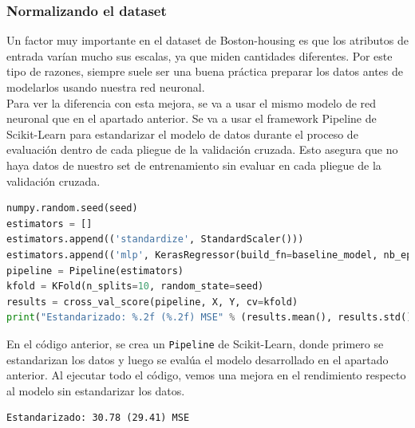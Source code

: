 \subsubsection{Normalizando el dataset}
Un factor muy importante en el dataset de Boston-housing es que los atributos de entrada varían mucho sus escalas, ya que miden cantidades diferentes. Por este tipo de razones, siempre suele ser una buena práctica preparar los datos antes de modelarlos usando nuestra red neuronal.\\
Para ver la diferencia con esta mejora, se va a usar el mismo modelo de red neuronal que en el apartado anterior. Se va a usar el framework Pipeline de Scikit-Learn para estandarizar el modelo de datos durante el proceso de evaluación dentro de cada pliegue de la validación cruzada. Esto asegura que no haya datos de nuestro set de entrenamiento sin evaluar en cada pliegue de la validación cruzada.
\begin{lstlisting}[language=Python]
numpy.random.seed(seed)
estimators = []
estimators.append(('standardize', StandardScaler()))
estimators.append(('mlp', KerasRegressor(build_fn=baseline_model, nb_epoch=50, batch_size=5, verbose=0)))
pipeline = Pipeline(estimators)
kfold = KFold(n_splits=10, random_state=seed)
results = cross_val_score(pipeline, X, Y, cv=kfold)
print("Estandarizado: %.2f (%.2f) MSE" % (results.mean(), results.std()))
\end{lstlisting}
En el código anterior, se crea un \lstinline{Pipeline} de Scikit-Learn, donde primero se estandarizan los datos y luego se evalúa el modelo desarrollado en el apartado anterior. Al ejecutar todo el código, vemos una mejora en el rendimiento respecto al modelo sin estandarizar los datos.
\begin{lstlisting}
Estandarizado: 30.78 (29.41) MSE
\end{lstlisting}
